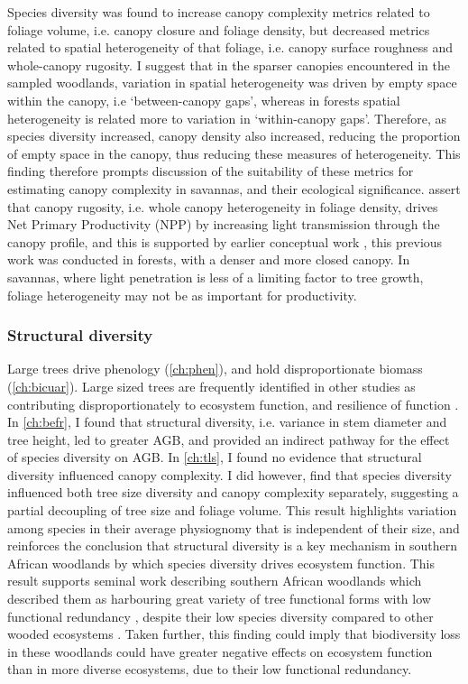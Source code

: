 \begin{refsection}
Species diversity was found to increase canopy complexity metrics related to foliage volume, i.e. canopy closure and foliage density, but decreased metrics related to spatial heterogeneity of that foliage, i.e. canopy surface roughness and whole-canopy rugosity. I suggest that in the sparser canopies encountered in the sampled woodlands, variation in spatial heterogeneity was driven by empty space within the canopy, i.e `between-canopy gaps', whereas in forests spatial heterogeneity is related more to variation in `within-canopy gaps'. Therefore, as species diversity increased, canopy density also increased, reducing the proportion of empty space in the canopy, thus reducing these measures of heterogeneity. This finding therefore prompts discussion of the suitability of these metrics for estimating canopy complexity in savannas, and their ecological significance. \citet{Hardiman2011} assert that canopy rugosity, i.e. whole canopy heterogeneity in foliage density, drives Net Primary Productivity (NPP) by increasing light transmission through the canopy profile, and this is supported by earlier conceptual work \citep{Horn1971}, this previous work was conducted in forests, with a denser and more closed canopy. In savannas, where light penetration is less of a limiting factor to tree growth, foliage heterogeneity may not be as important for productivity. 

\subsubsection{Structural diversity}
\label{discussion:sssec:struc}

Large trees drive phenology (\autoref{ch:phen}), and hold disproportionate biomass (\autoref{ch:bicuar}). Large sized trees are frequently identified in other studies as contributing disproportionately to ecosystem function, and resilience of function \citep{Ali2021}. In \autoref{ch:befr}, I found that structural diversity, i.e. variance in stem diameter and tree height, led to greater AGB, and provided an indirect pathway for the effect of species diversity on AGB. In \autoref{ch:tls}, I found no evidence that structural diversity influenced canopy complexity. I did however, find that species diversity influenced both tree size diversity and canopy complexity separately, suggesting a partial decoupling of tree size and foliage volume. This result highlights variation among species in their average physiognomy that is independent of their size, and reinforces the conclusion that structural diversity is a key mechanism in southern African woodlands by which species diversity drives ecosystem function. This result supports seminal work describing southern African woodlands which described them as harbouring great variety of tree functional forms with low functional redundancy \citep{}, despite their low species diversity compared to other wooded ecosystems \citep{}. Taken further, this finding could imply that biodiversity loss in these woodlands could have greater negative effects on ecosystem function than in more diverse ecosystems, due to their low functional redundancy.


\end{refsection}
